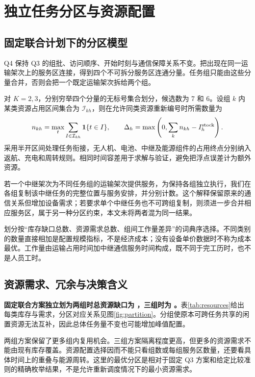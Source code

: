 \section{独立任务分区与资源配置}
\subsection{固定联合计划下的分区模型}
Q4 保持 Q3 的组批、访问顺序、开始时刻与通信保障关系不变。把出现在同一运输架次上的服务区连接，得到四个不可拆分服务区连通分量。任务组只能由这些分量合并，否则会把一个既定运输架次拆给两个组。

对 $K=2,3$，分别穷举四个分量的无标号集合划分，候选数为 7 和 6。设组 $k$ 内某类资源占用区间集合为 $\mathcal I_{kh}$，则在允许同类资源重新编号时所需数量为
\begin{equation}
n_{kh}=\max_t\sum_{I\in\mathcal I_{kh}}\mathbf 1\{t\in I\},\qquad
\Delta_h=\max\left(0,\sum_kn_{kh}-I_h^{\rm stock}\right).
\label{eq:partition}
\end{equation}
采用半开区间处理任务衔接，无人机、电池、中继及能源组件的占用终点分别纳入返航、充电和周转规则。相同时间容差用于求解与验证，避免把浮点误差计为额外资源。

若一个中继架次为不同任务组的运输架次提供服务，为保持各组独立执行，我们在各组复制该中继任务的完整位置与服务安排，并分别计数。这个解释保留原来的通信关系但增加设备需求；若要求单个中继任务也不可跨组复制，则须进一步合并相应服务区，属于另一种分区约束，本文未将两者混为同一结果。

划分按“库存缺口总数、资源需求总数、组间工作量差异”的词典序选择。不同类别的数量直接相加是配置规模指标，不是经济成本；没有设备单价数据时不称为成本最优。工作量由运输占用时间加中继通信服务时间构成，既不同于完工历时，也不是人员工时。

\subsection{资源需求、冗余与决策含义}
\textbf{固定联合方案独立划为两组时总资源缺口为 \GapTwo{}，三组时为 \GapThree{}。}表\ref{tab:resources}给出每类库存与需求，分区对应关系见图\ref{fig:partition}。分组使原本可跨任务共享的闲置资源无法互补，因此总体任务量不变也可能增加峰值配置。

两组方案保留了更多组内复用机会。三组方案隔离程度更高，但更多的资源需求不能由现有库存覆盖。资源配置选择因而不能只看组数或每组服务区数量，还要看具体时间上的重叠与能源周转。这里的最优分区是相对于固定 Q3 方案和给定比较准则的精确枚举结果，不是允许重新调度情况下的最小资源需求。
\FloatBarrier

